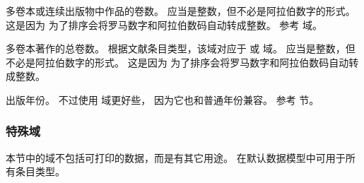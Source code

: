\begin{fieldlist}


多卷本或连续出版物中作品的卷数。
应当是整数，但不必是阿拉伯数字的形式。
这是因为 \biber 为了排序会将罗马数字和阿拉伯数码自动转成整数。
参考  域。




多卷本著作的总卷数。
根据文献条目类型，该域对应于  或  域。
应当是整数，但不必是阿拉伯数字的形式。
这是因为 \biber 为了排序会将罗马数字和阿拉伯数码自动转成整数。




出版年份。
不过使用  域更好些，
因为它也和普通年份兼容。
参考  节。

\end{fieldlist}

\subsubsection{特殊域}%
\label{bib:fld:spc}


本节中的域不包括可打印的数据，而是有其它用途。
在默认数据模型中可用于所有条目类型。

